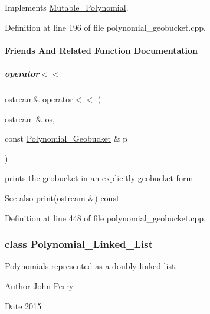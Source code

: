 Implements \hyperlink{group__polygroup_aa7a14a4cbb110840e55d656d7c6fe3ff}{Mutable\+\_\+\+Polynomial}.



Definition at line 196 of file polynomial\+\_\+geobucket.\+cpp.



\paragraph{Friends And Related Function Documentation}
\mbox{\label{group__polygroup_af97062198c6ade3e8d3077308e89669d}} 
\subparagraph{\texorpdfstring{operator$<$$<$}{operator<<}}
{\footnotesize\ttfamily ostream\& operator$<$$<$ (\begin{DoxyParamCaption}\item[{ostream \&}]{os,  }\item[{const \hyperlink{group__polygroup_class_polynomial___geobucket}{Polynomial\+\_\+\+Geobucket} \&}]{p }\end{DoxyParamCaption})\hspace{0.3cm}{\ttfamily [friend]}}



prints the geobucket in an explicitly geobucket form 

\begin{DoxySeeAlso}{See also}
\hyperlink{group__polygroup_a3c8cb0c53e9acf4d60345fb4b4dbb807}{print(ostream \&) const} 
\end{DoxySeeAlso}


Definition at line 448 of file polynomial\+\_\+geobucket.\+cpp.

\label{class_polynomial___linked___list}
\subsubsection{class Polynomial\+\_\+\+Linked\+\_\+\+List}
Polynomials represented as a doubly linked list. 

\begin{DoxyAuthor}{Author}
John Perry 
\end{DoxyAuthor}
\begin{DoxyDate}{Date}
2015 
\end{DoxyDate}


